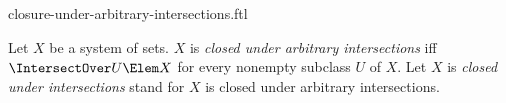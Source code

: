 \documentclass{stex}
\begin{document}
\begin{smodule}{closure-under-arbitrary-intersections.ftl}



\begin{definition*}[forthel,for={closed under arbitrary intersections,closed under intersections}]
  Let $X$ be a system of sets.
  $X$ is \emph{closed under arbitrary intersections} iff $\IntersectOver U \Elem X$ for every nonempty subclass $U$ of $X$.
  Let $X$ is \emph{closed under intersections} stand for $X$ is closed under arbitrary intersections.
\end{definition*}

\end{smodule}
\end{document}
